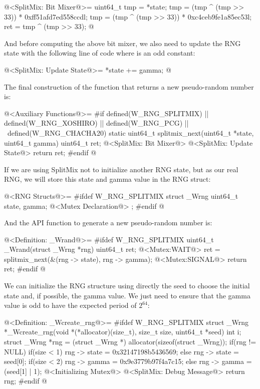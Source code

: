 \iniciocodigo
@<SplitMix: Bit Mixer@>=
{
  uint64_t tmp = *state;
  tmp = (tmp ^ (tmp >> 33)) * 0xff51afd7ed558ccdl;
  tmp = (tmp ^ (tmp >> 33)) * 0xc4ceb9fe1a85ec53l;
  ret = tmp ^ (tmp >> 33);
} 
@
\fimcodigo

And before computing the above bit mixer, we also need to update the
RNG state with the following line of code where  is
an odd constant:

\iniciocodigo
@<SplitMix: Update State@>=
{
  *state +=  gamma;
} 
@
\fimcodigo

The final construction of the function that returns a new
pseudo-random number is:

\iniciocodigo
@<Auxiliary Functions@>=
#if defined(W_RNG_SPLITMIX) || defined(W_RNG_XOSHIRO) || defined(W_RNG_PCG) || \
  defined(W_RNG_CHACHA20)
static uint64_t splitmix_next(uint64_t *state, uint64_t gamma){
  uint64_t ret;
  @<SplitMix: Bit Mixer@>
  @<SplitMix: Update State@>
  return ret;
}
#endif
@
\fimcodigo

If we are using SplitMix not to initialize another RNG state, but as
our real RNG, we will store this state and gamma value in the RNG
struct:

\iniciocodigo
@<RNG Structs@>=
#ifdef W_RNG_SPLITMIX
struct _Wrng{
  uint64_t state, gamma;
  @<Mutex Declaration@>
};
#endif
@
\fimcodigo

And the API function to generate a new pseudo-random number is:

\iniciocodigo
@<Definition: \_Wrand@>=
#ifdef W_RNG_SPLITMIX
uint64_t _Wrand(struct _Wrng *rng){
  uint64_t ret;
  @<Mutex:WAIT@>
  ret = splitmix_next(&(rng -> state), rng -> gamma);
  @<Mutex:SIGNAL@>
  return ret;
}
#endif
@
\fimcodigo

We can initialize the RNG structure using directly the seed to choose
the initial state and, if possible, the gamma value. We just need to
ensure that the gamma value is odd to have the expected period of
$2^{64}$:

\iniciocodigo
@<Definition: \_Wcreate\_rng@>=
#ifdef W_RNG_SPLITMIX
struct _Wrng *_Wcreate_rng(void *(*allocator)(size_t), size_t size,
                           uint64_t *seed){
  int i;
  struct _Wrng *rng = (struct _Wrng *) allocator(sizeof(struct _Wrng));
  if(rng != NULL){
    if(size < 1)
      rng -> state = 0x32147198b5436569;
    else
      rng -> state = seed[0];
    if(size < 2)
      rng -> gamma = 0x9e3779b97f4a7c15;
    else
      rng -> gamma = (seed[1] | 1);
    @<Initializing Mutex@>
    @<SplitMix: Debug Message@>
  }
  return rng;
}
#endif
@
\fimcodigo

